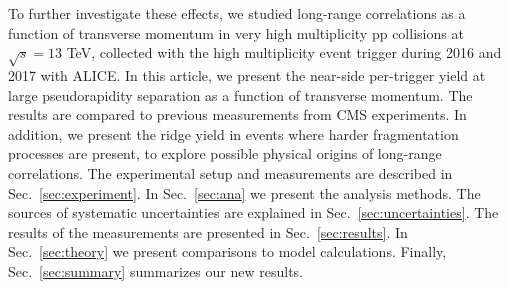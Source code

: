 % 

To further investigate these effects, we studied long-range correlations as a function of transverse momentum in very high multiplicity pp collisions at $\sqrt{s} =13$ TeV, collected with the high multiplicity event trigger during 2016 and 2017 with ALICE. In this article, we present the near-side per-trigger yield at large pseudorapidity separation as a function of transverse momentum. The results are compared to previous measurements from CMS experiments. In addition, we present the ridge yield in events where harder fragmentation processes are present, to explore possible physical origins of long-range correlations.
The experimental setup and measurements are described in Sec.~\ref{sec:experiment}. In Sec.~\ref{sec:ana} we present the analysis methods. The sources of systematic uncertainties are explained in Sec.~\ref{sec:uncertainties}. The results of the measurements are presented in Sec.~\ref{sec:results}. In Sec.~\ref{sec:theory} we present comparisons to model calculations.
Finally, Sec.~\ref{sec:summary} summarizes our new results.

